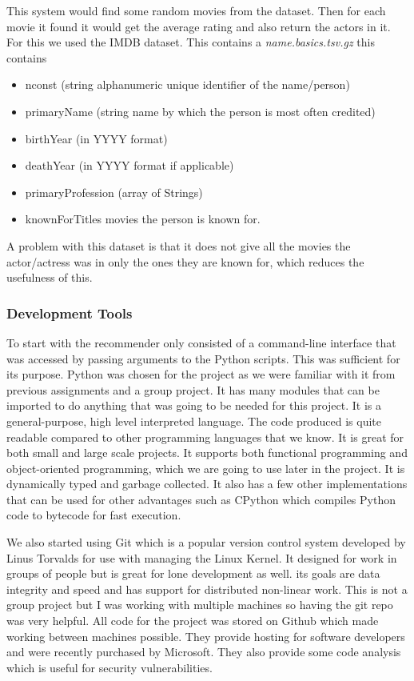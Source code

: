             This system would find some random movies from the dataset. Then for each movie it found it would get the average rating and also return the actors in it. For this we used the IMDB dataset. This contains a \textit{name.basics.tsv.gz} this contains 
            \begin{itemize}
                \item nconst (string alphanumeric unique identifier of the name/person) 
                \item primaryName (string name by which the person is most often credited)
                \item birthYear  (in YYYY format)
                \item deathYear (in YYYY format if applicable)
                \item primaryProfession (array of Strings)
                \item knownForTitles  movies the person is known for. 
            \end{itemize}
             A problem with this dataset is that it does not give all the movies the actor/actress was in only the ones they are known for, which reduces the usefulness of this. 

            \subsubsection{Development Tools}
                To start with the recommender only consisted of a command-line interface that was accessed by passing arguments to the Python scripts. This was sufficient for its purpose. Python was chosen for the project as we were familiar with it from previous assignments and a group project. It has many modules that can be imported to do anything that was going to be needed for this project. It is a general-purpose, high level interpreted language. The code produced is quite readable compared to other programming languages that we know. It is great for both small and large scale projects. It supports both functional programming and object-oriented programming, which we are going to use later in the project. It is dynamically typed and garbage collected. It also has a few other implementations that can be used for other advantages such as CPython which compiles Python code to bytecode for fast execution.
                
                We also started using Git which is a popular version control system developed by Linus Torvalds for use with managing the Linux Kernel. It designed for work in groups of people but is great for lone development as well. its goals are data integrity and speed and has support for distributed non-linear work. This is not a group project but I was working with multiple machines so having the git repo was very helpful. All code for the project was stored on Github which made working between machines possible. They provide hosting for software developers and were recently purchased by Microsoft. They also provide some code analysis which is useful for security vulnerabilities.
                
